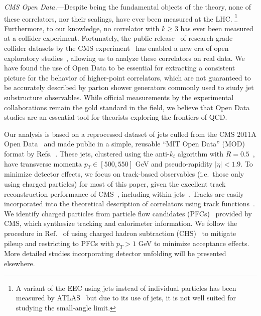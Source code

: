 \documentclass[aps,prl,twocolumn,showpacs,10pt,superscriptaddress,preprintnumbers,nofootinbib,longbibliography]{revtex4-1}
\begin{document}
\emph{CMS Open Data.}---Despite being the fundamental objects of the theory, none of these correlators, nor their scalings, have ever been measured at the LHC.%
%
\footnote{A variant of the EEC using jets instead of individual particles has been measured by ATLAS~\cite{ATLAS:2017qir,ATLAS:2020mee} but due to its use of jets, it is not well suited for studying the small-angle limit.}
%
Furthermore, to our knowledge, no correlator with $k\geq 3$ has ever been measured at a collider experiment.
%
Fortunately, the public release~\cite{CERNOpenDataPortal} of research-grade collider datasets by the CMS experiment~\cite{Chatrchyan:2008aa,CMS:OpenAccessPolicy} has enabled a new era of open exploratory studies~\cite{Larkoski:2017bvj,Tripathee:2017ybi,PaktinatMehdiabadi:2019ujl,Cesarotti:2019nax,Komiske:2019fks,Lester:2019bso,Apyan:2019ybx,Komiske:2019jim,Bhaduri:2019zkd,refId0,An:2021yqd,Elgammal:2021rne}, allowing us to analyze these correlators on real data.
%
We have found the use of Open Data to be essential for extracting a consistent picture for the behavior of higher-point correlators, which are not guaranteed to be accurately described by parton shower generators commonly used to study jet substructure observables.
%
While official measurements by the experimental collaborations remain the gold standard in the field, we believe that Open Data studies are an essential tool for theorists exploring the frontiers of QCD.


Our analysis is based on a reprocessed dataset of jets culled from the CMS 2011A Open Data~\cite{CMS:JetPrimary2011A} and made public in a simple, reusable ``MIT Open Data'' (MOD) format by Refs.~\cite{Komiske:2019jim,komiske_patrick_2019_3340205}.
%
These jets, clustered using the anti-$k_t$ algorithm with $R = 0.5$~\cite{Cacciari:2008gp,Cacciari:2011ma}, have transverse momenta $p_T \in [500,550]$ GeV and pseudo-rapidity $|\eta| < 1.9$.
%
To minimize detector effects, we focus on track-based observables (i.e.~those only using charged particles) for most of this paper, given the excellent track reconstruction performance of CMS~\cite{CMS:2014pgm}, including within jets~\cite{CMS:2012oyn}.
%
Tracks are easily incorporated into the theoretical description of correlators using track functions~\cite{Chang:2013rca,Chang:2013iba,Elder:2017bkd,Elder:2018mcr,Li:2021zcf}.
%
We identify charged particles from particle flow candidates (PFCs)~\cite{CMS:2017yfk} provided by CMS, which synthesize tracking and calorimeter information.
%
We follow the procedure in Ref.~\cite{Komiske:2019jim} of using charged hadron subtraction (CHS)~\cite{CMS:2014ata} to mitigate pileup and restricting to PFCs with $p_T > 1$ GeV to minimize acceptance effects.
%
More detailed studies incorporating detector unfolding will be presented elsewhere.
\end{document}
